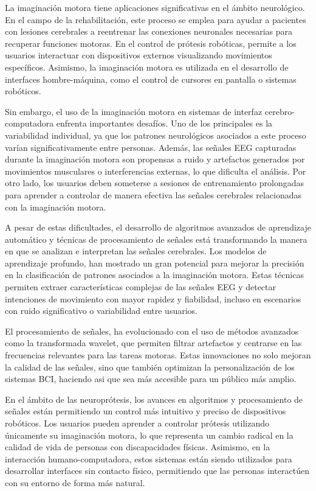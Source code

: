 La imaginación motora tiene aplicaciones significativas en el ámbito neurológico. En el campo de la rehabilitación, este proceso se emplea para ayudar a pacientes con lesiones cerebrales a reentrenar las conexiones neuronales necesarias para recuperar funciones motoras. En el control de prótesis robóticas, permite a los usuarios interactuar con dispositivos externos visualizando movimientos específicos. Asimismo, la imaginación motora es utilizada en el desarrollo de interfaces hombre-máquina, como el control de cursores en pantalla o sistemas robóticos.

Sin embargo, el uso de la imaginación motora en sistemas de interfaz cerebro-computadora enfrenta importantes desafíos. Uno de los principales es la variabilidad individual, ya que los patrones neurológicos asociados a este proceso varían significativamente entre personas. Además, las señales EEG capturadas durante la imaginación motora son propensas a ruido y artefactos generados por movimientos musculares o interferencias externas, lo que dificulta el análisis. Por otro lado, los usuarios deben someterse a sesiones de entrenamiento prolongadas para aprender a controlar de manera efectiva las señales cerebrales relacionadas con la imaginación motora.

A pesar de estas dificultades, el desarrollo de algoritmos avanzados de aprendizaje automático y técnicas de procesamiento de señales está transformando la manera en que se analizan e interpretan las señales cerebrales. Los modelos de aprendizaje profundo, han mostrado un gran potencial para mejorar la precisión en la clasificación de patrones asociados a la imaginación motora. Estas técnicas permiten extraer características complejas de las señales EEG y detectar intenciones de movimiento con mayor rapidez y fiabilidad, incluso en escenarios con ruido significativo o variabilidad entre usuarios.

El procesamiento de señales, ha evolucionado con el uso de métodos avanzados como la transformada wavelet, que permiten filtrar artefactos y centrarse en las frecuencias relevantes para las tareas motoras. Estas innovaciones no solo mejoran la calidad de las señales, sino que también optimizan la personalización de los sistemas BCI, haciendo asi que sea más accesible para un público más amplio.

En el ámbito de las neuroprótesis, los avances en algoritmos y procesamiento de señales están permitiendo un control más intuitivo y preciso de dispositivos robóticos. Los usuarios pueden aprender a controlar prótesis utilizando únicamente su imaginación motora, lo que representa un cambio radical en la calidad de vida de personas con discapacidades físicas. Asimismo, en la interacción humano-computadora, estos sistemas están siendo utilizados para desarrollar interfaces sin contacto físico, permitiendo que las personas interactúen con su entorno de forma más natural.

